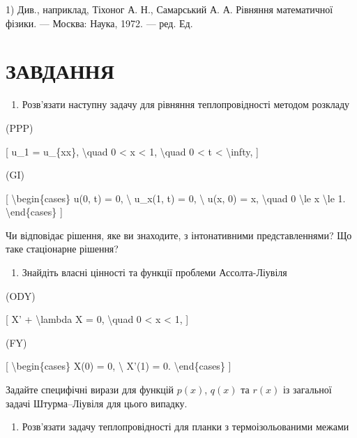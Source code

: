 \documentclass[
]{article}
\providecommand{\tightlist}{%
  \setlength{\itemsep}{0pt}\setlength{\parskip}{0pt}}
\begin{document}
1) Див., наприклад, Тіхоног А. Н., Самарський А. А. Рівняння
математичної фізики. --- Москва: Наука, 1972. --- ред. Ед.

\section{ЗАВДАННЯ}\label{ux437ux430ux432ux434ux430ux43dux43dux44f-4}

\begin{enumerate}
\def\labelenumi{\arabic{enumi}.}
\tightlist
\item
  Розв'язати наступну задачу для рівняння теплопровідності методом
  розкладу
\end{enumerate}

(PPP)

{[} u\_1 = u\_\{xx\}, \textbackslash quad 0 \textless{} x \textless{} 1,
\textbackslash quad 0 \textless{} t \textless{} \textbackslash infty,
{]}

(GI)

{[} \textbackslash begin\{cases\} u(0, t) = 0, \textbackslash{} u\_x(1,
t) = 0, \textbackslash{} u(x, 0) = x, \textbackslash quad 0
\textbackslash le x \textbackslash le 1. \textbackslash end\{cases\} {]}

Чи відповідає рішення, яке ви знаходите, з інтонативними
представленнями? Що таке стаціонарне рішення?

\begin{enumerate}
\def\labelenumi{\arabic{enumi}.}
\setcounter{enumi}{1}
\tightlist
\item
  Знайдіть власні цінності та функції проблеми Ассолта-Ліувіля
\end{enumerate}

(ODY)

{[} X' + \textbackslash lambda X = 0, \textbackslash quad 0 \textless{}
x \textless{} 1, {]}

(FY)

{[} \textbackslash begin\{cases\} X(0) = 0, \textbackslash{} X'(1) = 0.
\textbackslash end\{cases\} {]}

Задайте специфічні вирази для функцій \(p(x)\), \(q(x)\) та \(r(x)\) із
загальної задачі Штурма--Ліувіля для цього випадку.

\begin{enumerate}
\def\labelenumi{\arabic{enumi}.}
\setcounter{enumi}{2}
\tightlist
\item
  Розв'язати задачу теплопровідності для планки з термоізольованими
  межами
\end{enumerate}
\end{document}
